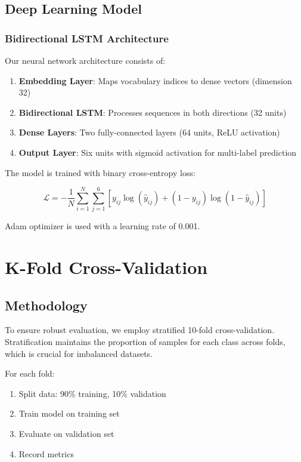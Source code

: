 \documentclass[conference]{IEEEtran}
\begin{document}
\subsection{Deep Learning Model}

\subsubsection{Bidirectional LSTM Architecture}

Our neural network architecture consists of:

\begin{enumerate}
    \item \textbf{Embedding Layer}: Maps vocabulary indices to dense vectors (dimension 32)
    \item \textbf{Bidirectional LSTM}: Processes sequences in both directions (32 units)
    \item \textbf{Dense Layers}: Two fully-connected layers (64 units, ReLU activation)
    \item \textbf{Output Layer}: Six units with sigmoid activation for multi-label prediction
\end{enumerate}

The model is trained with binary cross-entropy loss:

\begin{equation}
\mathcal{L} = -\frac{1}{N}\sum_{i=1}^{N}\sum_{j=1}^{6}[y_{ij}\log(\hat{y}_{ij}) + (1-y_{ij})\log(1-\hat{y}_{ij})]
\end{equation}

Adam optimizer is used with a learning rate of 0.001.

\section{K-Fold Cross-Validation}
\label{sec:validation}

\subsection{Methodology}

To ensure robust evaluation, we employ stratified 10-fold cross-validation. Stratification maintains the proportion of samples for each class across folds, which is crucial for imbalanced datasets.

For each fold:
\begin{enumerate}
    \item Split data: 90\% training, 10\% validation
    \item Train model on training set
    \item Evaluate on validation set
    \item Record metrics
\end{enumerate}
\end{document}
